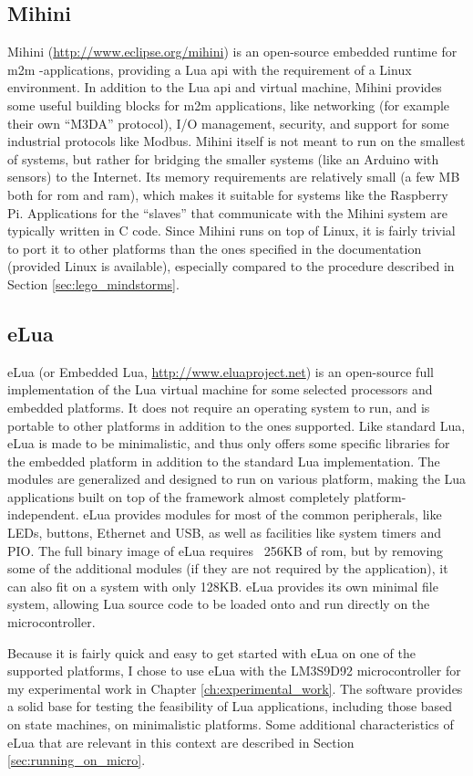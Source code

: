 \subsection{Mihini}
\label{sec:mihini}
Mihini (\url{http://www.eclipse.org/mihini}) is an open-source embedded runtime for \gls{m2m} -applications, providing a Lua \gls{api} with the requirement of a Linux environment. In addition to the Lua \gls{api} and virtual machine, Mihini provides some useful building blocks for \gls{m2m} applications, like networking (for example their own “M3DA” protocol), I/O management, security, and support for some industrial protocols like Modbus. Mihini itself is not meant to run on the smallest of systems, but rather for bridging the smaller systems (like an Arduino with sensors) to the Internet. Its memory requirements are relatively small (a few MB both for \gls{rom} and \gls{ram}), which makes it suitable for systems like the Raspberry Pi. Applications for the “slaves” that communicate with the Mihini system are typically written in C code. Since Mihini runs on top of Linux, it is fairly trivial to port it to other platforms than the ones specified in the documentation (provided Linux is available), especially compared to the procedure described in Section \ref{sec:lego_mindstorms}.

\subsection{eLua}
\label{sec:elua}
eLua (or Embedded Lua, \url{http://www.eluaproject.net}) is an open-source full implementation of the Lua virtual machine for some selected processors and embedded platforms. It does not require an operating system to run, and is portable to other platforms in addition to the ones supported. Like standard Lua, eLua is made to be minimalistic, and thus only offers some specific libraries for the embedded platform in addition to the standard Lua implementation. The modules are generalized and designed to run on various platform, making the Lua applications built on top of the framework almost completely platform-independent. eLua provides modules for most of the common peripherals, like LEDs, buttons, Ethernet and USB, as well as facilities like system timers and PIO. The full binary image of eLua requires ~256KB of \gls{rom}, but by removing some of the additional modules (if they are not required by the application), it can also fit on a system with only 128KB. eLua provides its own minimal file system, allowing Lua source code to be loaded onto and run directly on the microcontroller.

Because it is fairly quick and easy to get started with eLua on one of the supported platforms, I chose to use eLua with the LM3S9D92 microcontroller for my experimental work in Chapter \ref{ch:experimental_work}. The software provides a solid base for testing the feasibility of Lua applications, including those based on state machines, on minimalistic platforms. Some additional characteristics of eLua that are relevant in this context are described in Section \ref{sec:running_on_micro}.